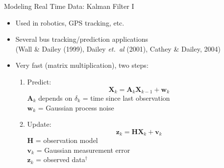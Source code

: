 \documentclass[10pt,t]{beamer}
\newcommand{\bX}{\mathbf{X}}
\newcommand{\mat}[1]{\mathbf{#1}}
\renewcommand{\vec}[1]{\boldsymbol{#1}}
\begin{document}
\begin{frame}{Modeling Real Time Data: Kalman Filter I}
  \onslide<+->
  \begin{itemize}[<+- | alert@+>]
    \item Used in robotics, GPS tracking, etc.

    \item Several bus tracking/prediction applications\\
      (Wall \& Dailey (1999), Dailey \emph{et.~al} (2001),
      Cathey \& Dailey, 2004)

    \item Very fast (matrix multiplication), two steps:
      \begin{enumerate}
        \item Predict:
          \begin{equation*}
            \bX_k = \mat{A}_k \bX_{k-1} + \vec{w}_k
          \end{equation*}
          $\mat{A}_k$ depends on $\delta_k$ = time since last observation\\
          $\vec{w}_k$ = Gaussian process noise
        \item Update:
          \begin{equation*}
            \vec{z}_k = \mat{H} \bX_k + \vec{v}_k
          \end{equation*}
          $\mat{H} $ = observation model\\
          $\vec{v}_k$ = Gaussian measurement error\\
          $\vec{z}_k$ = observed data$^\dagger$
      \end{enumerate}
  \end{itemize}
  \onslide<+->
\end{frame}
\end{document}
